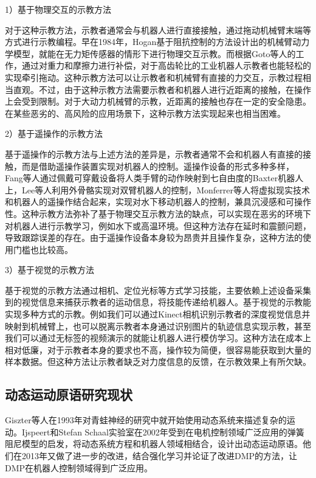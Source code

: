 1）基于物理交互的示教方法

对于这种示教方法，示教者通常会与机器人进行直接接触，通过拖动机械臂末端等方式进行示教编程。早在1984年，Hogan基于阻抗控制的方法设计出的机械臂动力学模型，就能在无力矩传感器的情形下进行物理交互示教\cite{Hogan1984a}。而根据Goto等人的工作，通过对重力和摩擦力进行补偿，对于高齿轮比的工业机器人示教者也能轻松的实现牵引拖动\cite{Goto2002}。这种示教方法可以让示教者和机械臂有直接的力交互，示教过程相当直观。不过，由于这种示教方法需要示教者和机器人进行近距离的接触，在操作上会受到限制。对于大动力机械臂的示教，近距离的接触也存在一定的安全隐患\cite{Li2021}。在某些恶劣的、高风险的应用场景下，这种示教方法实现起来也相当困难。

2）基于遥操作的示教方法

基于遥操作的示教方法与上述方法的差异是，示教者通常不会和机器人有直接的接触，而是借助遥操作装置实现对机器人的控制。遥操作设备的形式多种多样，Fang等人通过佩戴可穿戴设备将人类手臂的动作映射到七自由度的Baxter机器人上\cite{Fang2019a}，Lee等人利用外骨骼实现对双臂机器人的控制\cite{Lee2014}，Monferrer等人将虚拟现实技术和机器人的遥操作结合起来，实现对水下移动机器人的控制，兼具沉浸感和可操作性\cite{Monferrer2002}。这种示教方法弥补了基于物理交互示教方法的缺点，可以实现在恶劣的环境下对机器人进行示教学习，例如水下或高温环境。但这种方法存在延时和震颤问题\cite{Yang2017}，导致跟踪误差的存在。由于遥操作设备本身较为昂贵并且操作复杂，这种方法的使用门槛也比较高\cite{Li2022}。

3）基于视觉的示教方法

基于视觉的示教方法通过相机、定位光标等方式学习技能，主要依赖上述设备采集到的视觉信息来捕获示教者的运动信息，将技能传递给机器人。基于视觉的示教能实现多种方式的示教。例如我们可以通过Kinect相机识别示教者的深度视觉信息并映射到机械臂上\cite{Xu2018b}，也可以脱离示教者本身通过识别图片的轨迹信息实现示教\cite{Li2021}，甚至我们可以通过无标签的视频演示的就能让机器人进行模仿学习\cite{Sermanet2018}。这种方法在成本上相对低廉，对于示教者本身的要求也不高，操作较为简便，很容易能获取到大量的样本数据。但这种方法让示教者缺乏对力度信息的反馈，在示教效果上有所欠缺。

\subsection{动态运动原语研究现状}
Giszter等人在1993年对青蛙神经的研究中就开始使用动态系统来描述复杂的运动\cite{Giszter1993b}。Ijspeert和Stefan Schaal实验室在2002年受到在电机控制领域广泛应用的弹簧阻尼模型的启发，将动态系统方程和机器人领域相结合，设计出动态运动原语\cite{Ijspeert2002}。他们在2013年又做了进一步的改进，结合强化学习并论证了改进DMP的方法，让DMP在机器人控制领域得到广泛应用\cite{Ijspeert2013}。

